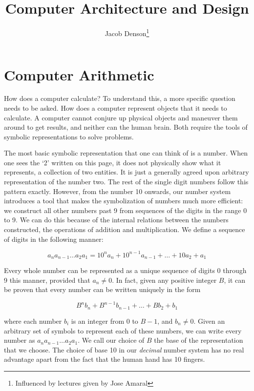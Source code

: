 \documentclass{report}
\title{Computer Architecture and Design}
\author{Jacob Denson\thanks{Influenced by lectures given by Jose Amaral}}
\begin{document}
\maketitle

\chapter{Computer Arithmetic}

How does a computer calculate? To understand this, a more specific question needs to be asked. How does a computer represent objects that it needs to calculate. A computer cannot conjure up physical objects and maneuver them around to get results, and neither can the human brain. Both require the tools of symbolic representations to solve problems.

The most basic symbolic representation that one can think of is a number. When one sees the `2' written on this page, it does not physically show what it represents, a collection of two entities. It is just a generally agreed upon arbitrary representation of the number two. The rest of the single digit numbers follow this pattern exactly. However, from the number 10 onwards, our number system introduces a tool that makes the symbolization of numbers much more efficient: we construct all other numbers past 9 from sequences of the digits in the range 0 to 9. We can do this because of the internal relations between the numbers constructed, the operations of addition and multiplication. We define a sequence of digits in the following manner:

\[ a_n a_{n-1} \dots a_2 a_1 = 10^n a_n + 10^{n-1} a_{n-1} + \dots + 10a_2 + a_1 \]

\noindent Every whole number can be represented as a unique sequence of digits 0 through 9 this manner, provided that $a_n \neq 0$. In fact, given any positive integer $B$, it can be proven that every number can be written uniquely in the form

\[ B^n b_n + B^{n-1} b_{n-1} + \dots + B b_2 + b_1\]

\noindent where each number $b_i$ is an integer from $0$ to $B - 1$, and $b_n \neq 0$. Given an arbitrary set of symbols to represent each of these numbers, we can write every number as $a_n a_{n-1} \dots a_2 a_1$. We call our choice of $B$ the base of the representation that we choose. The choice of base 10 in our \emph{decimal} number system has no real advantage apart from the fact that the human hand has 10 fingers.
\end{document}
